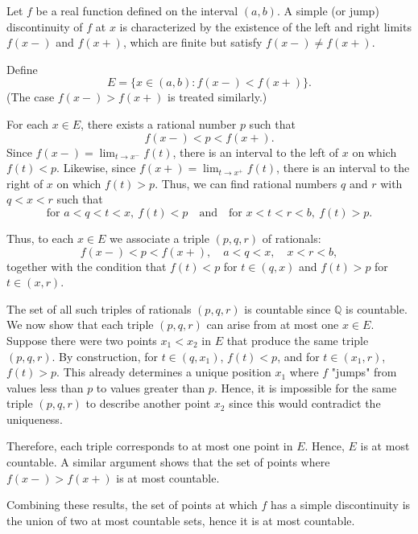 \documentclass[11pt]{article}
\begin{document}
\begin{exercise}{17}
    Let $f$ be a real function defined on the interval $(a,b)$. A simple (or
jump) discontinuity of $f$ at $x$ is characterized by the existence of the
left and right limits $f(x-)$ and $f(x+)$, which are finite but satisfy
$f(x-) \neq f(x+)$.

Define
\[
E = \{ x \in (a,b) : f(x-) < f(x+) \}.
\]
(The case $f(x-) > f(x+)$ is treated similarly.)

For each $x \in E$, there exists a rational number $p$ such that
\[
f(x-) < p < f(x+).
\]
Since $f(x-) = \lim_{t \to x^-} f(t)$, there is an interval to the left of
$x$ on which $f(t) < p$. Likewise, since $f(x+) = \lim_{t \to x^+} f(t)$, there
is an interval to the right of $x$ on which $f(t) > p$. Thus, we can find
rational numbers $q$ and $r$ with $q < x < r$ such that
\[
\text{for } a < q < t < x,\ f(t) < p
\quad \text{and} \quad
\text{for } x < t < r < b,\ f(t) > p.
\]

Thus, to each $x \in E$ we associate a triple $(p,q,r)$ of rationals:
\[
f(x-) < p < f(x+), \quad a < q < x, \quad x < r < b,
\]
together with the condition that $f(t) < p$ for $t \in (q,x)$ and
$f(t) > p$ for $t \in (x,r)$.

The set of all such triples of rationals $(p,q,r)$ is countable since $\mathbb{Q}$ is countable.
We now show that each triple $(p,q,r)$ can arise from at most one $x \in E$.
Suppose there were two points $x_1 < x_2$ in $E$ that produce the same triple
$(p,q,r)$. By construction, for $t \in (q,x_1)$, $f(t) < p$, and for
$t \in (x_1,r)$, $f(t) > p$. This already determines a unique position $x_1$
where $f$ "jumps" from values less than $p$ to values greater than $p$. Hence,
it is impossible for the same triple $(p,q,r)$ to describe another point $x_2$
since this would contradict the uniqueness.

Therefore, each triple corresponds to at most one point in $E$. Hence, $E$ is
at most countable. A similar argument shows that the set of points where
$f(x-) > f(x+)$ is at most countable.

Combining these results, the set of points at which $f$ has a simple
discontinuity is the union of two at most countable sets, hence it is at most
countable.
\end{exercise}
\end{document}
